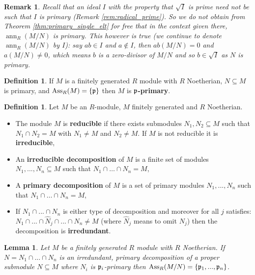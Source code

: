 \documentclass[12pt]{article}
\theoremstyle{plain}
\newtheorem{lemma}[thm]{Lemma}
\theoremstyle{definition}
\newtheorem{defn}[thm]{Definition} %
\newtheorem{remark}[thm]{Remark}
\begin{document}
	\begin{remark}
		\emph{Recall that an ideal $I$ with the property that $\sqrt{I}$ is prime need not be such that $I$ is primary (Remark \ref{rem:radical_prime}). So we do not obtain from Theorem \ref{thm:primary_single_elt} for free that in the context given there, $\operatorname{ann}_R(M/N)$ is primary. This however is true (we continue to denote $\operatorname{ann}_R(M/N)$ by $I$): say $ab \in I$ and $a \not\in I$, then $ab(M/N) = 0$ and $a(M/N) \neq 0$, which means $b$ is a zero-divisor of $M/N$ and so $b \in \sqrt{I}$ as $N$ is primary.}
	\end{remark}
	\begin{defn}
		If $M$ is a finitely generated $R$ module with $R$ Noetherian, $N \subseteq M$ is primary, and $\operatorname{Ass}_R(M) = \lbrace \frak{p}\rbrace$ then $M$ is \textbf{$\frak{p}$-primary}.
	\end{defn}
	\begin{defn}
		Let $M$ be an $R$-module, $M$ finitely generated and $R$ Noetherian. 
		\begin{itemize}
			\item The module $M$ is \textbf{reducible} if there exists submodules $N_1,N_2 \subseteq M$ such that $N_1 \cap N_2 = M$ with $N_1 \neq M$ and $N_2 \neq M$. If $M$ is not reducible it is \textbf{irreducible},
			\item An \textbf{irreducible decomposition} of $M$ is a finite set of modules $N_1,...,N_n \subseteq M$ such that $N_1 \cap \hdots \cap N_n = M$,
			\item A \textbf{primary decomposition} of $M$ is a set of primary modules $N_1,...,N_n$ such that $N_1 \cap \hdots \cap N_n = M$,
			\item If $N_1 \cap ... \cap N_n$ is either type of decomposition and moreover for all $j$ satisfies: $N_1 \cap ... \cap \hat{N}_j \cap ... \cap N_n \neq M$ (where $\hat{N}_j$ means to omit $N_j$) then the decomposition is \textbf{irredundant}.
		\end{itemize}
	\end{defn}
	\begin{lemma}
		\label{lem:irred_primary_ass} Let $M$ be a finitely generated $R$ module with $R$ Noetherian. If $N = N_1 \cap ... \cap N_n$ is an irredundant, primary decomposition of a proper submodule $N \subseteq M$ where $N_i$ is $\frak{p}_i$-primary then $\operatorname{Ass}_R(M/N) = \lbrace \frak{p}_1,...,\frak{p}_n\rbrace$.
	\end{lemma}
\end{document}
